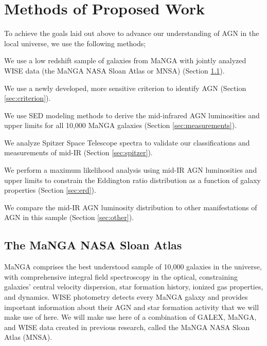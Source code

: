 \documentclass[12pt, preprint]{hacked-aastex}
\newlength{\mylen}
\newenvironment{ditemize}
{ \begin{list}{}{%
\setlength{\topsep}{0pt}%
\setlength{\partopsep}{3pt}%
\setlength{\itemsep}{1pt}\setlength{\parsep}{1pt}%
\setlength{\itemindent}{0pt}\setlength{\listparindent}{12pt}%
\setlength{\leftmargin}{24pt}\setlength{\rightmargin}{0in}%
\setlength{\labelsep}{3pt}\setlength{\labelwidth}{6pt}%
\setlength{\mylen}{3pt}
\renewcommand{\makelabel}{\makebox[\labelwidth][l]{\raisebox{\mylen}{\tiny$\bullet$}\hspace{\fill}}}}}
{\end{list}}
\begin{document}
\section{Methods of Proposed Work\label{sec:methods}}

To achieve the goals laid out above to advance our understanding 
of AGN in the local universe, we use the following methods;
\begin{ditemize}
    \item We use a low redshift sample of galaxies from MaNGA with 
    jointly analyzed WISE data (the MaNGA NASA Sloan Atlas or MNSA)
    (Section \ref{sec:mnsa}).
    \item We use a newly developed, more sensitive criterion to 
    identify AGN  (Section \ref{sec:criterion}).
    \item We use SED modeling methods to derive the mid-infrared AGN 
    luminosities and upper limits for all 10,000 MaNGA galaxies
    (Section \ref{sec:measurements}). 
    \item We analyze Spitzer Space Telescope spectra to validate our 
    classifications and measurements of mid-IR (Section
    \ref{sec:spitzer}).
    \item We perform a maximum likelihood analysis using mid-IR AGN luminosities 
     and upper limits to constrain the Eddington ratio  distribution as a 
     function of galaxy properties (Section \ref{sec:erd}).
    \item We compare the mid-IR AGN luminosity distribution to other manifestations 
    of AGN in this sample (Section \ref{sec:other}).
\end{ditemize}

\subsection{The MaNGA NASA Sloan Atlas}
\label{sec:mnsa}

MaNGA comprises the best understood sample of 10,000 galaxies in the universe, 
with comprehensive integral field spectroscopy in the  optical, constraining 
galaxies' central velocity dispersion, star formation history, ionized gas properties,
and dynamics. WISE photometry detects every MaNGA galaxy and provides important 
information about their AGN and star formation activity that we will make use of
here. We will make use here of a combination of GALEX, MaNGA, and WISE 
data created in previous research, called the MaNGA NASA Sloan Atlas (MNSA).
\end{document}
